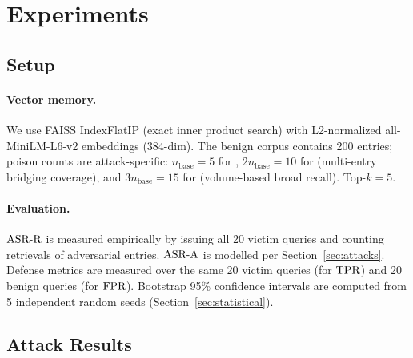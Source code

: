 \section{Experiments}
\label{sec:experiments}

\subsection{Setup}

\paragraph{Vector memory.}
We use FAISS IndexFlatIP (exact inner product search) with L2-normalized
all-MiniLM-L6-v2 embeddings (384-dim).  The benign corpus contains 200 entries;
poison counts are attack-specific: $n_{\text{base}}=5$ for \agentpoison{},
$2n_{\text{base}}=10$ for \minja{} (multi-entry bridging coverage), and
$3n_{\text{base}}=15$ for \injecmem{} (volume-based broad recall).  Top-$k=5$.

\paragraph{Evaluation.}
$\text{ASR-R}$ is measured empirically by issuing all 20 victim queries and counting
retrievals of adversarial entries.  $\text{ASR-A}$ is modelled per
Section~\ref{sec:attacks}.  Defense metrics are measured over the same 20
victim queries (for $\text{TPR}$) and 20 benign queries (for $\text{FPR}$).  Bootstrap
95\% confidence intervals are computed from 5 independent random seeds
(Section~\ref{sec:statistical}).

\subsection{Attack Results}
\label{sec:attack_results}


